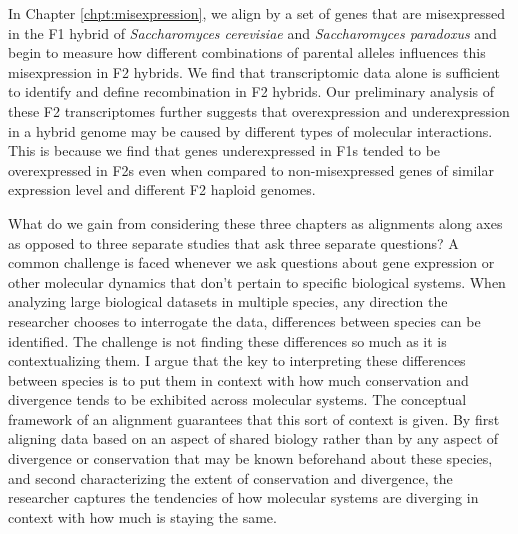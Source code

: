 In Chapter \ref{chpt:misexpression}, we align by a set of genes that are misexpressed in the F1 hybrid of \textit{Saccharomyces cerevisiae} and \textit{Saccharomyces paradoxus} and begin to measure how different combinations of parental alleles influences this misexpression in F2 hybrids. We find that transcriptomic data alone is sufficient to identify and define recombination in F2 hybrids. Our preliminary analysis of these F2 transcriptomes further suggests that overexpression and underexpression in a hybrid genome may be caused by different types of molecular interactions. This is because we find that genes underexpressed in F1s tended to be overexpressed in F2s even when compared to non-misexpressed genes of similar expression level and different F2 haploid genomes.

What do we gain from considering these three chapters as alignments along axes as opposed to three separate studies that ask three separate questions? A common challenge is faced whenever we ask questions about gene expression or other molecular dynamics that don't pertain to specific biological systems. When analyzing large biological datasets in multiple species, any direction the researcher chooses to interrogate the data, differences between species can be identified. The challenge is not finding these differences so much as it is contextualizing them. I argue that the key to interpreting these differences between species is to put them in context with how much conservation and divergence tends to be exhibited across molecular systems. The conceptual framework of an alignment guarantees that this sort of context is given. By first aligning data based on an aspect of shared biology rather than by any aspect of divergence or conservation that may be known beforehand about these species, and second characterizing the extent of conservation and divergence, the researcher captures the tendencies of how molecular systems are diverging in context with how much is staying the same.